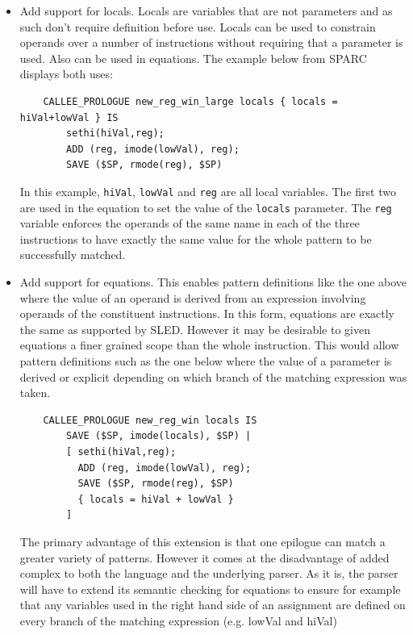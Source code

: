 \begin{itemize}
\item Add support for locals. Locals are variables that are not
  parameters and as such don't require definition before use. Locals
  can be used to constrain operands over a number of instructions
  without requiring that a parameter is used. Also can be used in
  equations. The example below from SPARC displays both uses:

\begin{verbatim}
    CALLEE_PROLOGUE new_reg_win_large locals { locals = hiVal+lowVal } IS
        sethi(hiVal,reg);
        ADD (reg, imode(lowVal), reg);
        SAVE ($SP, rmode(reg), $SP)
\end{verbatim}

  In this example, {\tt hiVal}, {\tt lowVal} and {\tt reg} are
  all local variables. The first two are used in the equation
  to set the value of the {\tt locals} parameter. The {\tt reg}
  variable enforces the operands of the same name in each of the
  three instructions to have exactly the same value for the whole
  pattern to be successfully matched.

\item Add support for equations. This enables pattern definitions
  like the one above where the value of an operand is derived from an
  expression involving operands of the constituent instructions. In
  this form, equations are exactly the same as supported by SLED.
  However it may be desirable to given equations a finer grained
  scope than the whole instruction. This would allow pattern
  definitions such as the one below where the value of a parameter
  is derived or explicit depending on which branch of the matching
  expression was taken.

\begin{verbatim}
    CALLEE_PROLOGUE new_reg_win locals IS
        SAVE ($SP, imode(locals), $SP) |
        [ sethi(hiVal,reg);
          ADD (reg, imode(lowVal), reg);
          SAVE ($SP, rmode(reg), $SP)
          { locals = hiVal + lowVal }
        ]
\end{verbatim}

  The primary advantage of this extension is that one epilogue
  can match a greater variety of patterns. However it comes at
  the disadvantage of added complex to both the language and the
  underlying parser. As it is, the parser will have to extend its
  semantic checking for equations to ensure for example that any
  variables used in the right hand side of an assignment are defined
  on every branch of the matching expression (e.g. lowVal and hiVal)

\end{itemize}


